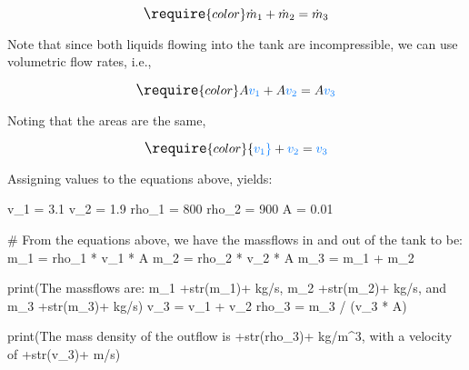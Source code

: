 \documentclass[
  1.2em,
  letterpaper,
  DIV=11,
  numbers=noendperiod]{scrartcl}
\newenvironment{Shaded}{\begin{snugshade}}{\end{snugshade}}
\newcommand{\BuiltInTok}[1]{\textcolor[rgb]{0.00,0.23,0.31}{#1}}
\newcommand{\CommentTok}[1]{\textcolor[rgb]{0.37,0.37,0.37}{#1}}
\newcommand{\DecValTok}[1]{\textcolor[rgb]{0.68,0.00,0.00}{#1}}
\newcommand{\FloatTok}[1]{\textcolor[rgb]{0.68,0.00,0.00}{#1}}
\newcommand{\NormalTok}[1]{\textcolor[rgb]{0.00,0.23,0.31}{#1}}
\newcommand{\OperatorTok}[1]{\textcolor[rgb]{0.37,0.37,0.37}{#1}}
\newcommand{\StringTok}[1]{\textcolor[rgb]{0.13,0.47,0.30}{#1}}
\begin{document}
\[
\large
\require{color}\dot{m}_{1} + \dot{m}_{2} = \dot{m}_{3}
\]

Note that since both liquids flowing into the tank are incompressible,
we can use volumetric flow rates, i.e.,

\[
\large
\require{color}A {\color[rgb]{0.059472,0.501943,0.998465}v_1} + A {\color[rgb]{0.059472,0.501943,0.998465}v_2} = A {\color[rgb]{0.059472,0.501943,0.998465}v_3}
\]

Noting that the areas are the same,

\[
\large
\require{color}{\color[rgb]{0.059472,0.501943,0.998465}v_1} + {\color[rgb]{0.059472,0.501943,0.998465}v_2} = {\color[rgb]{0.059472,0.501943,0.998465}v_3}
\]

Assigning values to the equations above, yields:

\begin{Shaded}
\begin{Highlighting}[]
\NormalTok{v\_1 }\OperatorTok{=} \FloatTok{3.1}
\NormalTok{v\_2 }\OperatorTok{=} \FloatTok{1.9}
\NormalTok{rho\_1 }\OperatorTok{=} \DecValTok{800}
\NormalTok{rho\_2 }\OperatorTok{=} \DecValTok{900}
\NormalTok{A }\OperatorTok{=} \FloatTok{0.01}

\CommentTok{\# From the equations above, we have the massflows in and out of the tank to be:}
\NormalTok{m\_1 }\OperatorTok{=}\NormalTok{ rho\_1 }\OperatorTok{*}\NormalTok{ v\_1 }\OperatorTok{*}\NormalTok{ A}
\NormalTok{m\_2 }\OperatorTok{=}\NormalTok{ rho\_2 }\OperatorTok{*}\NormalTok{ v\_2 }\OperatorTok{*}\NormalTok{ A}
\NormalTok{m\_3 }\OperatorTok{=}\NormalTok{ m\_1 }\OperatorTok{+}\NormalTok{ m\_2}

\BuiltInTok{print}\NormalTok{(}\StringTok{\textquotesingle{}The massflows are: m\_1 \textquotesingle{}}\OperatorTok{+}\BuiltInTok{str}\NormalTok{(m\_1)}\OperatorTok{+}\StringTok{\textquotesingle{} kg/s, m\_2 \textquotesingle{}}\OperatorTok{+}\BuiltInTok{str}\NormalTok{(m\_2)}\OperatorTok{+}\StringTok{\textquotesingle{} kg/s, and m\_3 \textquotesingle{}}\OperatorTok{+}\BuiltInTok{str}\NormalTok{(m\_3)}\OperatorTok{+}\StringTok{\textquotesingle{} kg/s\textquotesingle{}}\NormalTok{)}
\NormalTok{v\_3 }\OperatorTok{=}\NormalTok{ v\_1 }\OperatorTok{+}\NormalTok{ v\_2}
\NormalTok{rho\_3 }\OperatorTok{=}\NormalTok{ m\_3 }\OperatorTok{/}\NormalTok{ (v\_3 }\OperatorTok{*}\NormalTok{ A)}

\BuiltInTok{print}\NormalTok{(}\StringTok{\textquotesingle{}The mass density of the outflow is \textquotesingle{}}\OperatorTok{+}\BuiltInTok{str}\NormalTok{(rho\_3)}\OperatorTok{+}\StringTok{\textquotesingle{} kg/m\^{}3, with a velocity of \textquotesingle{}}\OperatorTok{+}\BuiltInTok{str}\NormalTok{(v\_3)}\OperatorTok{+}\StringTok{\textquotesingle{} m/s\textquotesingle{}}\NormalTok{)}
\end{Highlighting}
\end{Shaded}
\end{document}
